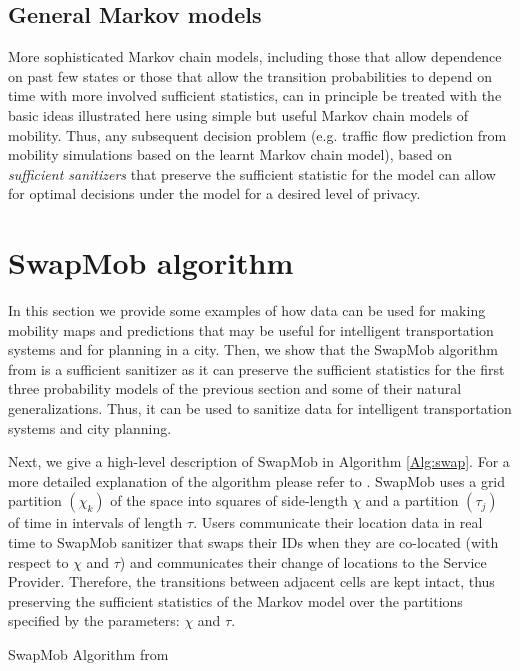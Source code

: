 \documentclass[times,twocolumn,final,authoryear]{elsarticle}
\begin{document}
\subsection{General Markov models}
More sophisticated Markov chain models, including those that allow dependence on past few states or those that allow the transition probabilities to depend on time with more involved sufficient statistics, can in principle be treated with the basic ideas illustrated here using simple but useful Markov chain models of mobility. 
Thus, any subsequent decision problem (e.g. traffic flow prediction from mobility simulations based on the learnt Markov chain model), based on {\em sufficient sanitizers} that preserve the sufficient statistic for the model can allow for optimal decisions under the model for a desired level of privacy. 


\section{SwapMob algorithm}\label{Sec:swapmob}

In this section we provide some examples of how data can be used for making mobility maps and predictions that may be useful for intelligent transportation systems and for planning in a city.
Then, we show that the SwapMob algorithm from \cite{Salas:2018-c} is a sufficient sanitizer as it can preserve the sufficient statistics for the first three probability models of the previous section and some of their natural generalizations. Thus, it can be used to sanitize data for intelligent transportation systems and city planning.

Next, we give a high-level description of SwapMob in Algorithm \ref{Alg:swap}. For a more detailed explanation of the algorithm please refer to \cite{Salas:2018-c}. 
SwapMob uses a grid partition $(\chi_k)$ of the space into squares of side-length $\chi$ and a partition $(\tau_j)$ of time in intervals of length $\tau$.
Users communicate their location data in real time to SwapMob sanitizer that swaps their IDs when they are co-located (with respect to $\chi$ and $\tau$) and communicates their change of locations to the Service Provider.
Therefore, the transitions between adjacent cells are kept intact, thus preserving the sufficient statistics of the Markov model over the partitions specified by the parameters: $\chi$ and $\tau$.
\begin{algorithm}[t]
\SetAlgoNoLine
{}

\caption{SwapMob Algorithm from \cite{Salas:2018-c}}\label{Alg:swap}
\label{alg:one}
\end{algorithm}
\end{document}
